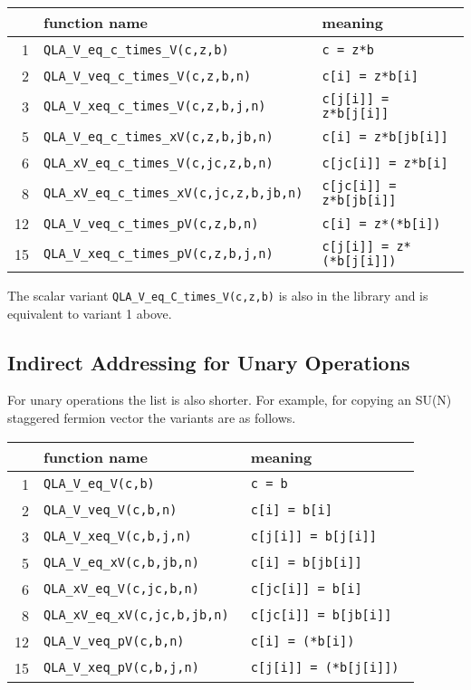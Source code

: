 \documentclass{article}
\begin{document}
\begin{center}
\begin{tabular}{|r|l|l|}
\hline
 & function name & meaning \\
\hline
1  & {\tt QLA\_V\_eq\_c\_times\_V(c,z,b)              } & {\tt c = z*b                         } \\
2  & {\tt QLA\_V\_veq\_c\_times\_V(c,z,b,n)           } & {\tt c[i] = z*b[i]                } \\
3  & {\tt QLA\_V\_xeq\_c\_times\_V(c,z,b,j,n)         } & {\tt c[j[i]] = z*b[j[i]]       } \\
5  & {\tt QLA\_V\_eq\_c\_times\_xV(c,z,b,jb,n)        } & {\tt c[i] = z*b[jb[i]]            } \\
6  & {\tt QLA\_xV\_eq\_c\_times\_V(c,jc,z,b,n)        } & {\tt c[jc[i]] = z*b[i]            } \\
8  & {\tt QLA\_xV\_eq\_c\_times\_xV(c,jc,z,b,jb,n)    } & {\tt c[jc[i]] = z*b[jb[i]]        } \\
12  & {\tt QLA\_V\_veq\_c\_times\_pV(c,z,b,n)          } & {\tt c[i] = z*(*b[i])             } \\
15  & {\tt QLA\_V\_xeq\_c\_times\_pV(c,z,b,j,n)       } & {\tt c[j[i]] = z*(*b[j[i]])     } \\
\hline
\end{tabular}
\end{center}

The scalar variant {\tt QLA\_V\_eq\_C\_times\_V(c,z,b)} is also
in the library and is equivalent to variant 1 above.

\subsection{Indirect Addressing for Unary Operations}

For unary operations the list is also shorter.  For example, for copying an
SU(N) staggered fermion vector the variants are as follows.

\begin{center}
\begin{tabular}{|r|l|l|}
\hline
 & function name & meaning \\
\hline
1  & {\tt QLA\_V\_eq\_V(c,b)              } & {\tt c = b                         } \\
2  & {\tt QLA\_V\_veq\_V(c,b,n)           } & {\tt c[i] = b[i]                } \\
3  & {\tt QLA\_V\_xeq\_V(c,b,j,n)         } & {\tt c[j[i]] = b[j[i]]       } \\
5  & {\tt QLA\_V\_eq\_xV(c,b,jb,n)        } & {\tt c[i] = b[jb[i]]            } \\
6  & {\tt QLA\_xV\_eq\_V(c,jc,b,n)        } & {\tt c[jc[i]] = b[i]            } \\
8  & {\tt QLA\_xV\_eq\_xV(c,jc,b,jb,n)    } & {\tt c[jc[i]] = b[jb[i]]        } \\
12  & {\tt QLA\_V\_veq\_pV(c,b,n)          } & {\tt c[i] = (*b[i])             } \\
15  & {\tt QLA\_V\_xeq\_pV(c,b,j,n)       } & {\tt c[j[i]] = (*b[j[i]])     } \\
\hline
\end{tabular}
\end{center}
\end{document}
